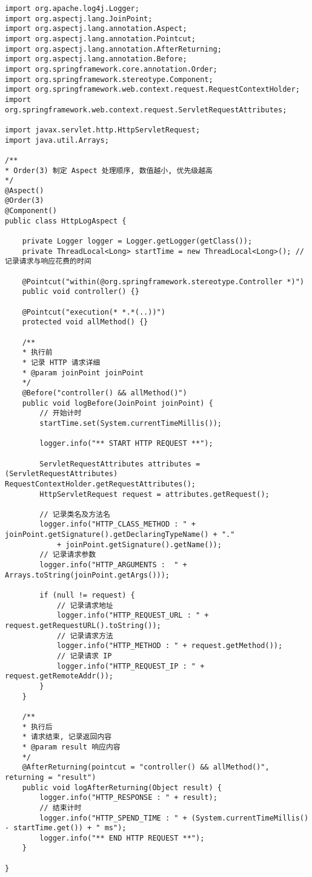 \begin{verbatim}
import org.apache.log4j.Logger;
import org.aspectj.lang.JoinPoint;
import org.aspectj.lang.annotation.Aspect;
import org.aspectj.lang.annotation.Pointcut;
import org.aspectj.lang.annotation.AfterReturning;
import org.aspectj.lang.annotation.Before;
import org.springframework.core.annotation.Order;
import org.springframework.stereotype.Component;
import org.springframework.web.context.request.RequestContextHolder;
import org.springframework.web.context.request.ServletRequestAttributes;

import javax.servlet.http.HttpServletRequest;
import java.util.Arrays;

/**
* Order(3) 制定 Aspect 处理顺序, 数值越小, 优先级越高
*/
@Aspect()
@Order(3)
@Component()
public class HttpLogAspect {

    private Logger logger = Logger.getLogger(getClass());
    private ThreadLocal<Long> startTime = new ThreadLocal<Long>(); // 记录请求与响应花费的时间

    @Pointcut("within(@org.springframework.stereotype.Controller *)")
    public void controller() {}

    @Pointcut("execution(* *.*(..))")
    protected void allMethod() {}

    /**
    * 执行前
    * 记录 HTTP 请求详细
    * @param joinPoint joinPoint
    */
    @Before("controller() && allMethod()")
    public void logBefore(JoinPoint joinPoint) {
        // 开始计时
        startTime.set(System.currentTimeMillis());

        logger.info("** START HTTP REQUEST **");

        ServletRequestAttributes attributes = (ServletRequestAttributes) RequestContextHolder.getRequestAttributes();
        HttpServletRequest request = attributes.getRequest();

        // 记录类名及方法名
        logger.info("HTTP_CLASS_METHOD : " + joinPoint.getSignature().getDeclaringTypeName() + "."
            + joinPoint.getSignature().getName());
        // 记录请求参数
        logger.info("HTTP_ARGUMENTS :  " + Arrays.toString(joinPoint.getArgs()));

        if (null != request) {
            // 记录请求地址
            logger.info("HTTP_REQUEST_URL : " + request.getRequestURL().toString());
            // 记录请求方法
            logger.info("HTTP_METHOD : " + request.getMethod());
            // 记录请求 IP
            logger.info("HTTP_REQUEST_IP : " + request.getRemoteAddr());
        }
    }

    /**
    * 执行后
    * 请求结束, 记录返回内容
    * @param result 响应内容
    */
    @AfterReturning(pointcut = "controller() && allMethod()", returning = "result")
    public void logAfterReturning(Object result) {
        logger.info("HTTP_RESPONSE : " + result);
        // 结束计时
        logger.info("HTTP_SPEND_TIME : " + (System.currentTimeMillis() - startTime.get()) + " ms");
        logger.info("** END HTTP REQUEST **");
    }

}
\end{verbatim}

